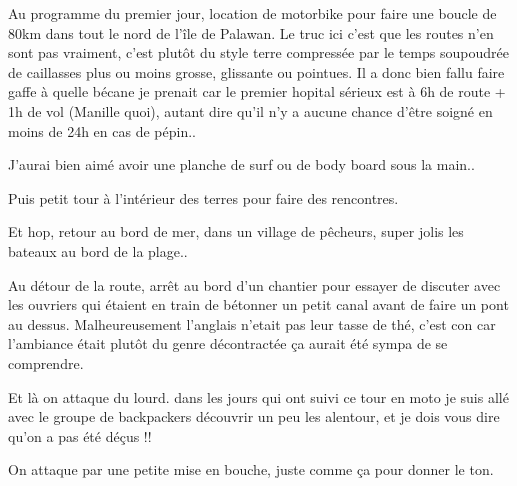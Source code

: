 \begin{multicols}{2}
Au programme du premier jour, location de motorbike pour faire une boucle de 80km dans tout le nord de l'île de Palawan. Le truc ici c'est que les routes n'en sont pas vraiment, c'est plutôt du style terre compressée par le temps soupoudrée de caillasses plus ou moins grosse, glissante ou pointues. Il a donc bien fallu faire gaffe à quelle bécane je prenait car le premier hopital sérieux est à 6h de route + 1h de vol (Manille quoi), autant dire qu'il n'y a aucune chance d'être soigné en moins de 24h en cas de pépin..


J'aurai bien aimé avoir une planche de surf ou de body board sous la main..


Puis petit tour à l'intérieur des terres pour faire des rencontres.


Et hop, retour au bord de mer, dans un village de pêcheurs, super jolis les bateaux au bord de la plage..


Au détour de la route, arrêt au bord d'un chantier pour essayer de discuter avec les ouvriers qui étaient en train de bétonner un petit canal avant de faire un pont au dessus. Malheureusement l'anglais n'etait pas leur tasse de thé, c'est con car l'ambiance était plutôt du genre décontractée ça aurait été sympa de se comprendre.


Et là on attaque du lourd. dans les jours qui ont suivi ce tour en moto je suis allé avec le groupe de backpackers découvrir un peu les alentour, et je dois vous dire qu'on a pas été déçus !!

On attaque par une petite mise en bouche, juste comme ça pour donner le ton.



\end{multicols}
